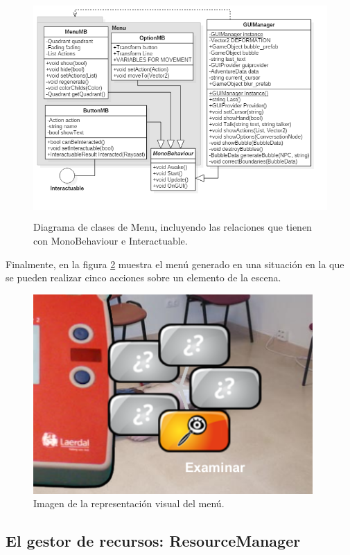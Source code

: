 \begin{figure}[h!]
	\centerline{\includegraphics[height=3.3in]{figures/it2/Menu.png}}
	\caption[Menu - Versión Final]{Diagrama de clases de Menu, incluyendo las relaciones que tienen con MonoBehaviour e Interactuable.}
	\label{menuit2}
\end{figure}

Finalmente, en la figura \ref{menuvisualit2} muestra el menú generado en una situación en la que se pueden realizar cinco acciones sobre un elemento de la escena. 

\begin{figure}[h!]
	\centerline{\includegraphics[height=3in]{figures/it2/apearance/menu.png}}
	\caption[Visual Menu - Versión Final]{Imagen de la representación visual del menú.}
	\label{menuvisualit2}
\end{figure}

\subsection{El gestor de recursos: ResourceManager}

